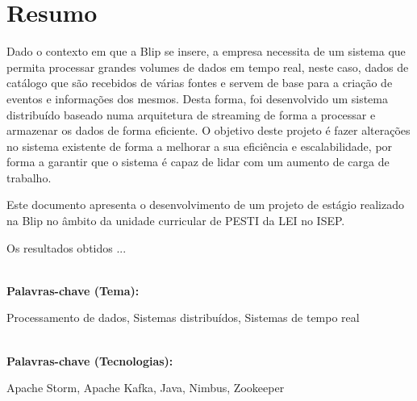 \titleformat{\chapter}[display]
{\normalfont\bfseries}{}{0pt}{\Huge}

\chapter*{Resumo}

Dado o contexto em que a Blip se insere, a empresa necessita de um sistema que permita processar
grandes volumes de dados em tempo real, neste caso, dados de catálogo que são recebidos de várias fontes
e servem de base para a criação de eventos e informações dos mesmos. Desta forma, foi desenvolvido 
um sistema distribuído baseado numa arquitetura de streaming de forma a processar e armazenar os 
dados de forma eficiente. O objetivo deste projeto é fazer alterações no sistema existente de forma 
a melhorar a sua eficiência e escalabilidade, por forma a garantir que o sistema é capaz de lidar 
com um aumento de carga de  trabalho.

Este documento apresenta o desenvolvimento de um projeto de estágio realizado na Blip no âmbito da 
unidade curricular de \ac{PESTI} da \ac{LEI} no \ac{ISEP}. 

Os resultados obtidos ...


\textbf{\\Palavras-chave (Tema): } 

Processamento de dados, Sistemas distribuídos, Sistemas de tempo real

\textbf{\\Palavras-chave (Tecnologias):}

Apache Storm, Apache Kafka, Java, Nimbus, Zookeeper



